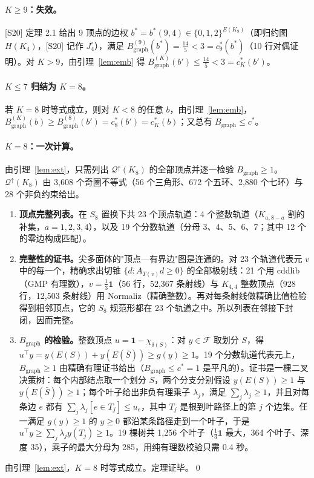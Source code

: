 \documentclass[11pt]{article}
\theoremstyle{remark}
\newcommand{\Bg}{B_{\mathrm{graph}}}
\newcommand{\Q}{\mathcal Q^{\uparrow}}
\begin{document}
\paragraph{$K\ge9$：失效。}[S20] 定理 2.1 给出 9 顶点的边权 $b^*=b^*(9,4)\in\{0,1,2\}^{E(K_9)}$（即归约图 $H(K_4)$，[S20] 记作 $J_4^\circ$），满足 $\Bg^{(9)}(b^*)=\tfrac{14}5<3=c^*_9(b^*)$（10 行对偶证明）。对 $K>9$，由引理~\ref{lem:emb} 得 $\Bg^{(K)}(b')\le\tfrac{14}5<3=c^*_K(b')$。

\paragraph{$K\le7$ 归结为 $K=8$。}若 $K=8$ 时等式成立，则对 $K<8$ 的任意 $b$，由引理~\ref{lem:emb}，$\Bg^{(K)}(b)\ge\Bg^{(8)}(b')=c^*_8(b')=c^*_K(b)$；又总有 $\Bg\le c^*$。

\paragraph{$K=8$：一次计算。}由引理~\ref{lem:ext}，只需列出 $\Q(K_8)$ 的全部顶点并逐一检验 $\Bg\ge1$。$\Q(K_8)$ 由 3,608 个奇圈不等式（56 个三角形、672 个五环、2,880 个七环）与 28 个非负约束给出。
\begin{enumerate}
\item \textbf{顶点完整列表。}在 $S_8$ 置换下共 23 个顶点轨道：4 个整数轨道（$K_{a,8-a}$ 割的补集，$a=1,2,3,4$），以及 19 个分数轨道（分母 3、4、5、6、7；其中 12 个的零边构成匹配）。
\item \textbf{完整性的证书。}尖多面体的"顶点—有界边"图是连通的。对 23 个轨道代表元 $v$ 中的每一个，精确求出切锥 $\{d:A_{T(v)}d\ge0\}$ 的全部极射线：21 个用 cddlib（GMP 有理数），$v=\tfrac13\mathbf 1$（56 行，52,367 条射线）与 $K_{4,4}$ 整数顶点（928 行，12,503 条射线）用 Normaliz（精确整数）。再对每条射线做精确比值检验得到相邻顶点，它的 $S_8$ 规范形都在 23 个轨道之中。所以列表在邻接下封闭，因而完整。
\item \textbf{$\Bg$ 的检验。}整数顶点 $u=\mathbf 1-\chi_{\delta(S)}$：对 $y\in\mathcal F$ 取划分 $S$，得 $u^\top y=y(E(S))+y(E(\bar S))\ge g(y)\ge1$。19 个分数轨道代表元上，$\Bg\ge1$ 由精确有理证书给出（$\Bg\le c^*=1$ 是平凡的）。证书是一棵二叉决策树：每个内部结点取一个划分 $S$，两个分支分别假设 $y(E(S))\ge1$ 与 $y(E(\bar S))\ge1$；每个叶子给出非负有理乘子 $\lambda_j$，满足 $\sum_j\lambda_j\ge1$，并且对每条边 $e$ 都有 $\sum_j\lambda_j[e\in T_j]\le u_e$，其中 $T_j$ 是根到叶路径上的第 $j$ 个边集。任一满足 $g(y)\ge1$ 的 $y\ge0$ 都沿某条路径走到一个叶子，于是 $u^\top y\ge\sum_j\lambda_jy(T_j)\ge1$。19 棵树共 1,256 个叶子（$\tfrac13\mathbf 1$ 最大，364 个叶子、深度 35），乘子的最大分母为 285，用纯有理数校验只需 0.4 秒。
\end{enumerate}
由引理~\ref{lem:ext}，$K=8$ 时等式成立。定理证毕。\qed
\end{document}
